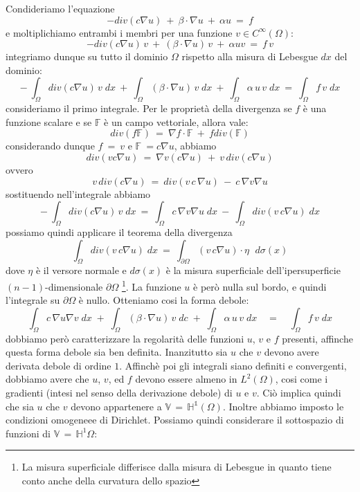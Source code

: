 \documentclass[12pt,a4paper]{report}
\theoremstyle{theorem}
\theoremstyle{definition}
\begin{document}
Condideriamo l'equazione
\[ -div(c\nabla{u}) \ + \ \beta \cdot \nabla{u} \ + \ \alpha u \ = \ f \]
e moltiplichiamo entrambi i membri per una funzione $v \in C^{\infty}(\Omega)$:
\[ -div(c\nabla{u}) \, v \ + \ (\beta \cdot \nabla{u}) \, v \ + \ \alpha u v \ = \ f \, v\]
integriamo dunque su tutto il dominio $\Omega$ rispetto alla misura di Lebesgue $dx$ del dominio:
\[ - \ \int_{\Omega}{div(c\nabla{u}) \, v \; dx} \ + \ \int_{\Omega}{(\beta \cdot \nabla{u}) \, v \; dx} \ + \ \int_{\Omega}{\alpha \, u \, v \; dx} \ = \ \int_{\Omega}{f  \, v \; dx}\]
consideriamo il primo integrale. Per le proprietà della divergenza se $f$ è una funzione scalare e se $\mathbb{F}$ è un campo vettoriale, allora vale:
\[ div(f \mathbb{F}) \ = \  \nabla f \cdot \mathbb{F} \ + \ f div(\mathbb{F})\]
considerando dunque $f \ = \ v$ e $\mathbb{F} \ = c \nabla u$, abbiamo
\[ div(v c \nabla u) \ = \  \nabla v (c \nabla u) \ + \ v \, div(c \nabla u)\]
ovvero
\[ v \, div(c \nabla u) \ = \ div(v \, c \, \nabla u) \ - \ c \, \nabla v \nabla u \]
sostituendo nell'integrale abbiamo
\[ - \ \int_{\Omega}{div(c\nabla{u}) \, v \; dx} \ = \ \int_{\Omega}{c \, \nabla v \nabla u \; dx} \ - \ \int_{\Omega}{div(v \, c \nabla u) \; dx}\]
possiamo quindi applicare il teorema della divergenza
\[ \int_{\Omega}{div(v \, c \nabla u) \; dx} \ = \ \int_{\partial \Omega}{ (v \, c \nabla u) \cdot \eta \, \, \; d \sigma (x)}\]
dove $\eta$ è il versore normale e $d \sigma (x) $ è la misura superficiale dell'ipersuperficie $(n-1)$-dimensionale $\partial \Omega $ \footnote{La misura superficiale differisce dalla misura di Lebesgue in quanto tiene conto anche della curvatura dello spazio}. La funzione $u$ è però nulla sul bordo, e quindi l'integrale su $\partial \Omega$ è nullo. Otteniamo cosi la forma debole:
\[ \int_{\Omega}{c \, \nabla u \nabla v \; dx} \; + \; \int_{\Omega}{(\beta \cdot \nabla u) \, v \; dc} \; + \; \int_{\Omega}{\alpha \, u \, v \; dx} \quad = \quad \int_{\Omega}{f \, v \; dx} \]
dobbiamo però caratterizzare la regolarità delle funzioni $u$, $v$ e $f$ presenti, affinche questa forma debole sia ben definita.
Inanzitutto sia $u$ che $v$ devono avere derivata debole di ordine $1$. Affinchè poi gli integrali siano definiti e convergenti, dobbiamo avere che $u$, $v$, ed $f$ devono essere almeno in $L^{2}(\Omega)$, cosi come i gradienti (intesi nel senso della derivazione debole) di $u$ e $v$. Ciò implica quindi che sia $u$ che $v$ devono appartenere a $ \mathbb{V} \, = \, \mathbb{H^1}(\Omega)$. Inoltre abbiamo imposto le condizioni omogeneee di Dirichlet. Possiamo quindi considerare il sottospazio di funzioni di $ \mathbb{V} \, = \, \mathbb{H}^1{\Omega}$:
\end{document}
